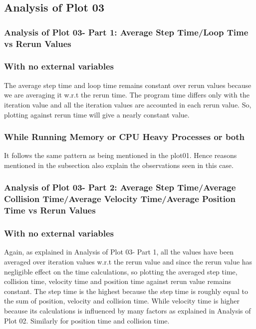 \documentclass[11pt]{article}
\begin{document}
\subsection{Analysis of Plot 03}
\subsubsection{Analysis of Plot 03- Part 1: Average Step Time/Loop Time vs Rerun Values}
\subsubsection* { With no external variables}
The average step time and loop time remains constant over rerun values because we are averaging it w.r.t the rerun time. The program time differs only with the iteration value and all the iteration values are accounted in each rerun value. So, plotting against rerun time will give a nearly constant value.

\subsubsection*{While Running Memory or CPU Heavy Processes or both}
It follows the same pattern as being mentioned in the plot01. Hence reasons mentioned in the subsection also explain the observations seen in this case.
\subsubsection{Analysis of Plot 03- Part 2: Average Step Time/Average Collision Time/Average Velocity Time/Average Position Time vs Rerun Values}
\subsubsection *{ With no external variables}
Again, as explained in Analysis of Plot 03- Part 1, all the values have been averaged over iteration values w.r.t the rerun value and since the rerun value has negligible effect on the time calculations, so plotting the averaged step time, collision time, velocity time and position time against rerun value remains constant.
The step time  is the highest because the step time is roughly equal to the sum of position, velocity and collision time.
While velocity time is higher because its calculations is influenced by many factors as explained in Analysis of Plot 02.
Similarly for position time and collision time.
\end{document}
